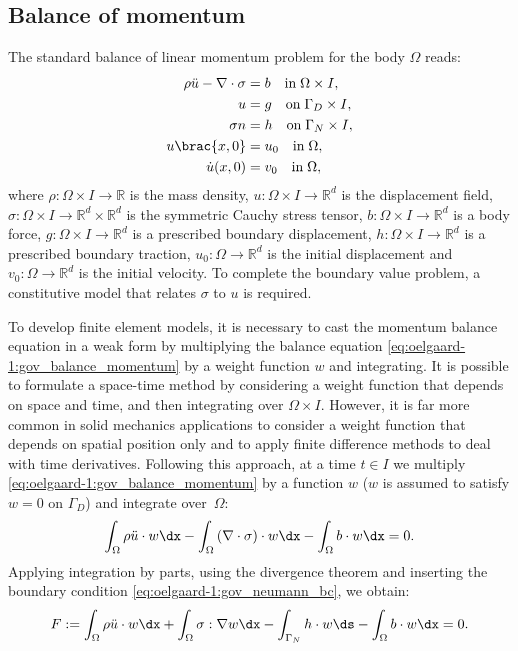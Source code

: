 \subsection{Balance of momentum}
%
The standard balance of linear momentum problem for the body $\Omega$
reads:
%
\begin{align}
  \rho \ddot{u} - \nabla \cdot \sigma  &= b \quad \text{in} \;
    \Omega \times I,
  \label{eq:oelgaard-1:gov_balance_momentum}
\\
  u &= g \quad \text{on} \; \Gamma_{D} \times I,
\\
  \sigma  n &= h \quad \text{on} \; \Gamma_{N} \times I,
  \label{eq:oelgaard-1:gov_neumann_bc}
\\
  u\brac{x, 0} &= u_{0} \quad \text{in} \; \Omega,
  \label{eq:oelgaard-1:gov_initial_condition_0}
\\
  \Dot{u}(x, 0) &= v_{0} \quad \text{in} \; \Omega,
  \label{eq:oelgaard-1:gov_initial_condition_1}
\end{align}
%
where $\rho: \Omega \times I \rightarrow \mathbb{R}$ is the mass density,
$u: \Omega \times I \rightarrow \mathbb{R}^{d}$ is the displacement field,
$\sigma: \Omega \times I \rightarrow \mathbb{R}^{d} \times \mathbb{R}^{d}$
is the symmetric Cauchy stress tensor, $b: \Omega \times I \rightarrow
\mathbb{R}^{d}$ is a body force, $g: \Omega \times I \rightarrow
\mathbb{R}^{d}$ is a prescribed boundary displacement, $h: \Omega \times
I \rightarrow \mathbb{R}^{d}$ is a prescribed boundary traction, $u_{0}:
\Omega \rightarrow \mathbb{R}^{d}$ is the initial displacement and $v_{0}:
\Omega \rightarrow \mathbb{R}^{d}$ is the initial velocity.
To complete the boundary value problem, a constitutive model that relates
$\sigma$ to $u$ is required.

To develop finite element models, it is necessary to cast the momentum
balance equation in a weak form by multiplying the balance equation
\eqref{eq:oelgaard-1:gov_balance_momentum} by a weight function $w$
and integrating.  It is possible to formulate a space-time method by
considering a weight function that depends on space and time, and then
integrating over $\Omega \times I$. However, it is far more common in
solid mechanics applications to consider a weight function that depends
on spatial position only and to apply finite difference methods to deal
with time derivatives.  Following this approach, at a time $t \in I$
we multiply \eqref{eq:oelgaard-1:gov_balance_momentum} by a function
$w$ ($w$ is assumed to satisfy $w = 0$ on $\Gamma_{D}$) and integrate
over~$\Omega$:
%
\begin{equation}
  \int_{\Omega} \rho \ddot{u} \cdot w \dx
- \int_{\Omega} \left( \nabla \cdot \sigma \right) \cdot w \dx
- \int_{\Omega} b \cdot w \dx = 0.
\end{equation}
%
Applying integration by parts, using the divergence theorem and inserting
the boundary condition \eqref{eq:oelgaard-1:gov_neumann_bc}, we obtain:
%
\begin{equation}
F := \int_{\Omega} \rho \ddot{u} \cdot w \dx
  + \int_{\Omega} \sigma : \nabla w \dx
  - \int_{\Gamma_{N}} h \cdot w \ds
  - \int_{\Omega} b \cdot w \dx = 0.
\label{eqn:oelgaard-1:F}
\end{equation}

